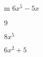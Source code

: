 \documentclass{article}
\begin{document}
\begin{multicols}{2}
m $6x^{5}-5x$\item $9$\item $8x^{5}$\item $6x^2+5$\item
\end{multicols}
\end{document}

